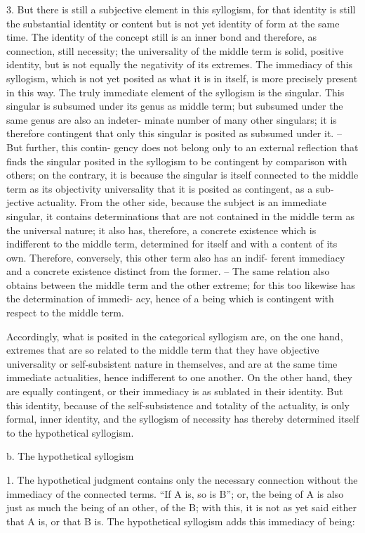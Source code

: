 3. But there is still a subjective element in this syllogism, for that identity
is still the substantial identity or content but is not yet identity of form at the
same time. The identity of the concept still is an inner bond and therefore,
as connection, still necessity; the universality of the middle term is solid,
positive identity, but is not equally the negativity of its extremes.
The immediacy of this syllogism, which is not yet posited as what it is in
itself, is more precisely present in this way. The truly immediate element
of the syllogism is the singular. This singular is subsumed under its genus
as middle term; but subsumed under the same genus are also an indeter-
minate number of many other singulars; it is therefore contingent that only
this singular is posited as subsumed under it. – But further, this contin-
gency does not belong only to an external reflection that finds the singular
posited in the syllogism to be contingent by comparison with others; on
the contrary, it is because the singular is itself connected to the middle
term as its objectivity universality that it is posited as contingent, as a sub-
jective actuality. From the other side, because the subject is an immediate
singular, it contains determinations that are not contained in the middle
term as the universal nature; it also has, therefore, a concrete existence
which is indifferent to the middle term, determined for itself and with a
content of its own. Therefore, conversely, this other term also has an indif-
ferent immediacy and a concrete existence distinct from the former. –
The same relation also obtains between the middle term and the
other extreme; for this too likewise has the determination of immedi-
acy, hence of a being which is contingent with respect to the middle
term.

Accordingly, what is posited in the categorical syllogism are, on the
one hand, extremes that are so related to the middle term that they have
objective universality or self-subsistent nature in themselves, and are at the
same time immediate actualities, hence indifferent to one another. On the
other hand, they are equally contingent, or their immediacy is as sublated in
their identity. But this identity, because of the self-subsistence and totality
of the actuality, is only formal, inner identity, and the syllogism of necessity
has thereby determined itself to the hypothetical syllogism.

b. The hypothetical syllogism

1. The hypothetical judgment contains only the necessary connection 
without the immediacy of the connected terms.
“If A is, so is B”;
or, the being of A is also just as much
the being of an other, of the B;
with this, it is not as yet said either that A is, or that B is.
The hypothetical syllogism adds this immediacy of being:

